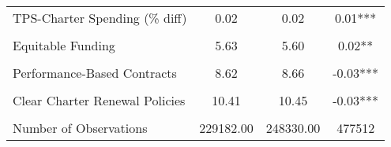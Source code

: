 \begin{table}[!h]
\begin{tabular}[t]{lccc}
TPS-Charter Spending (\% diff) & 0.02 & 0.02 & 0.01***\\
\cellcolor{gray!10}{Total Spending (per-pupil)} & \cellcolor{gray!10}{13213.70} & \cellcolor{gray!10}{13225.61} & \cellcolor{gray!10}{-11.91}\\
Equitable Funding & 5.63 & 5.60 & 0.02**\\
\cellcolor{gray!10}{No Caps on CS Growth} & \cellcolor{gray!10}{8.84} & \cellcolor{gray!10}{8.80} & \cellcolor{gray!10}{0.04***}\\
Performance-Based Contracts & 8.62 & 8.66 & -0.03***\\
\cellcolor{gray!10}{Transparent Charter Startup Policies} & \cellcolor{gray!10}{8.39} & \cellcolor{gray!10}{8.44} & \cellcolor{gray!10}{-0.05***}\\
Clear Charter Renewal Policies & 10.41 & 10.45 & -0.03***\\
\cellcolor{gray!10}{Exempt from State/District Regs} & \cellcolor{gray!10}{7.26} & \cellcolor{gray!10}{7.21} & \cellcolor{gray!10}{0.04***}\\
\midrule
Number of Observations & 229182.00 & 248330.00 & 477512\\
\bottomrule
\end{tabular}
\end{table}
